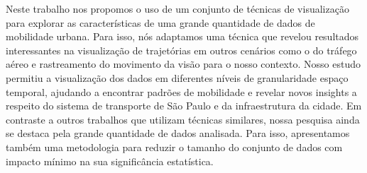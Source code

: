 Neste trabalho nos propomos o uso de um conjunto de técnicas de visualização
para explorar as características de uma grande quantidade de dados de
mobilidade urbana. Para isso, nós adaptamos uma técnica que revelou resultados
interessantes na visualização de trajetórias em outros cenários como o do
tráfego aéreo e rastreamento do movimento da visão para o nosso contexto.
Nosso estudo permitiu a visualização dos dados em diferentes níveis de
granularidade espaço temporal, ajudando a encontrar padrões de mobilidade e
revelar novos insights a respeito do sistema de transporte de S\~ao Paulo e da
infraestrutura da cidade. Em contraste a outros trabalhos que utilizam técnicas
similares, nossa pesquisa ainda se destaca pela grande quantidade de dados
analisada. Para isso, apresentamos também uma metodologia para reduzir o tamanho
do conjunto de dados com impacto mínimo na sua significância estatística. 
